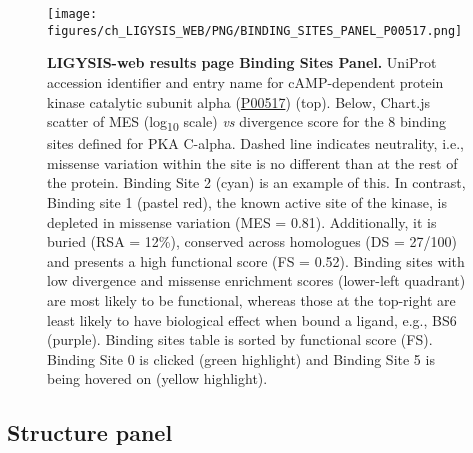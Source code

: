\begin{figure}[htb!]
    \centering
    \texttt{[image: figures/ch\_LIGYSIS\_WEB/PNG/BINDING\_SITES\_PANEL\_P00517.png]}
    \caption[LIGYSIS-web results page Binding Sites Panel]{\textbf{LIGYSIS-web results page Binding Sites Panel.} UniProt accession identifier and entry name for cAMP-dependent protein kinase catalytic subunit alpha (\href{https://www.uniprot.org/uniprotkb/P00517/entry}{P00517}) (top). Below, Chart.js scatter of MES (log\textsubscript{10} scale) \textit{vs} divergence score for the 8 binding sites defined for PKA C-alpha. Dashed line indicates neutrality, i.e., missense variation within the site is no different than at the rest of the protein. Binding Site 2 (cyan) is an example of this. In contrast, Binding site 1 (pastel red), the known active site of the kinase, is depleted in missense variation (MES = 0.81). Additionally, it is buried (RSA = 12\%), conserved across homologues (DS = 27/100) and presents a high functional score (FS = 0.52). Binding sites with low divergence and missense enrichment scores (lower-left quadrant) are most likely to be functional, whereas those at the top-right are least likely to have biological effect when bound a ligand, e.g., BS6 (purple). Binding sites table is sorted by functional score (FS). Binding Site 0 is clicked (green highlight) and Binding Site 5 is being hovered on (yellow highlight).}
    \label{fig:LIGYSIS_web_BINDING_SITES_PANEL}
\end{figure}

\subsection{Structure panel}

